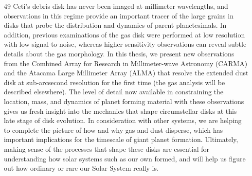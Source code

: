 49 Ceti's debris disk has never been imaged at millimeter wavelengths, and observations in this regime provide an important tracer of the large grains in disks that probe the distribution and dynamics of parent planetesimals. In addition, previous examinations of the gas disk were performed at low resolution with low signal-to-noise, whereas higher sensitivity observations can reveal subtle details about the gas morphology. In this thesis, we present new observations from the Combined Array for Research in Millimeter-wave Astronomy (CARMA) and the Atacama Large Millimeter Array (ALMA) that resolve the extended dust disk at sub-arcsecond resolution for the first time (the gas analysis will be described elsewhere). The level of detail now available in constraining the location, mass, and dynamics of planet forming material with these observations gives us fresh insight into the mechanics that shape circumstellar disks at this late stage of disk evolution. In consideration with other systems, we are helping to complete the picture of how and why gas and dust disperse, which has important implications for the timescale of giant planet formation. Ultimately, making sense of the processes that shape these disks are essential for understanding how solar systems such as our own formed, and will help us figure out how ordinary or rare our Solar System really is. 






